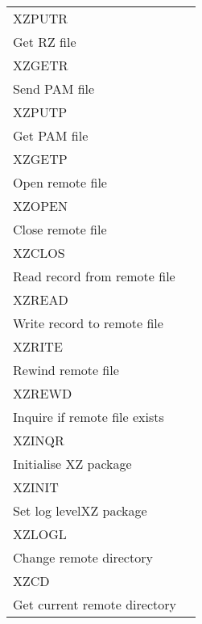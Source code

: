\begin{longtable}{|l@{\qquad}r|}
\quad XZPUTR                           &   \pageref{XZPUTR} \\
Get RZ file                              &                    \\
\quad XZGETR                           &   \pageref{XZGETR} \\
Send PAM file                            &                    \\
\quad XZPUTP                           &   \pageref{XZPUTP} \\
Get PAM file                             &                    \\
\quad XZGETP                           &   \pageref{XZGETP} \\
Open remote file                         &                    \\
\quad XZOPEN                           &   \pageref{XZOPEN} \\
Close remote file                        &                    \\
\quad XZCLOS                           &   \pageref{XZCLOS} \\
Read record from remote file             &                    \\
\quad XZREAD                           &   \pageref{XZREAD} \\
Write record to remote file              &                    \\
\quad XZRITE                           &   \pageref{XZRITE} \\
Rewind remote file                       &                    \\
\quad XZREWD                           &   \pageref{XZREWD} \\
Inquire if remote file exists            &                    \\
\quad XZINQR                           &   \pageref{XZINQR} \\
Initialise XZ package                    &                    \\
\quad XZINIT                           &   \pageref{XZINIT} \\
Set log levelXZ package                  &                    \\
\quad XZLOGL                           &   \pageref{XZLOGL} \\
Change remote directory                  &                    \\
\quad XZCD                             &   \pageref{XZCD}   \\
Get current remote directory             &                    \\

\end{longtable}
